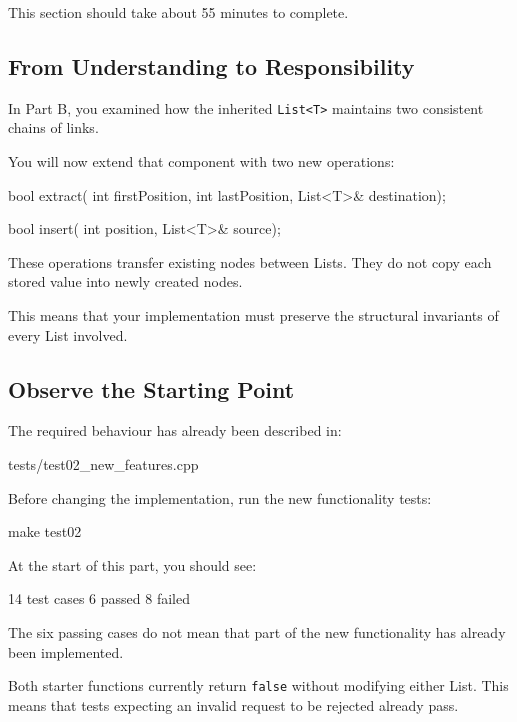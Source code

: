 \documentclass{csc2059practical}
\begin{document}
\begin{infobox}
This section should take about 55 minutes to complete.
\end{infobox}


\subsection{From Understanding to Responsibility}

In Part B, you examined how the inherited \texttt{List<T>} maintains two consistent chains of links.

You will now extend that component with two new operations:

\begin{cppcode}
bool extract(
    int firstPosition,
    int lastPosition,
    List<T>& destination);

bool insert(
    int position,
    List<T>& source);
\end{cppcode}

These operations transfer existing nodes between Lists. They do not copy each stored value into newly created nodes.

This means that your implementation must preserve the structural invariants of every List involved.


\subsection{Observe the Starting Point}

The required behaviour has already been described in:

\begin{terminal}
tests/test02_new_features.cpp
\end{terminal}

Before changing the implementation, run the new functionality tests:

\begin{terminal}
make test02
\end{terminal}

At the start of this part, you should see:

\begin{terminal}
14 test cases
6 passed
8 failed
\end{terminal}

The six passing cases do not mean that part of the new functionality has already been implemented.

Both starter functions currently return \texttt{false} without modifying either List. This means that tests expecting an invalid request to be rejected already pass.
\end{document}
